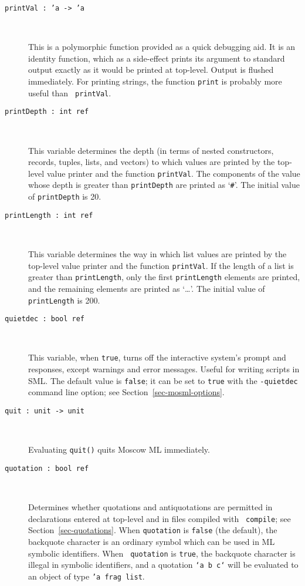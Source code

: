 \documentclass[fleqn]{article}
\begin{document}
\begin{description}
\item[{\tt printVal :\ 'a -> 'a}]\mbox{ }

  This is a polymorphic function provided as a quick debugging aid.
  It is an identity function, which as a side-effect prints its
  argument to standard output exactly as it would be printed at
  top-level.  Output is flushed immediately.  For printing strings,
  the function {\tt print} is probably more useful than {\tt
    printVal}.

\item[{\tt printDepth :\ int ref}]\mbox{ }

  This variable determines the depth (in terms of nested constructors,
  records, tuples, lists, and vectors) to which values are printed by
  the top-level value printer and the function {\tt printVal}. The
  components of the value whose depth is greater than {\tt printDepth}
  are printed as `{\tt \#}'.  The initial value of {\tt printDepth} is
  20. 

\item[{\tt printLength :\ int ref}]\mbox{ }

  This variable determines the way in which list values are printed by
  the top-level value printer and the function {\tt printVal}. If the
  length of a list is greater than {\tt printLength}, only the first
  {\tt printLength} elements are printed, and the remaining elements
  are printed as `\ldots'.  The initial value of {\tt printLength} is
  200.

\item[{\tt quietdec :\ bool ref}]\mbox{ }

  This variable, when {\tt true}, turns off the interactive system's
  prompt and responses, except warnings and error messages.  Useful
  for writing scripts in SML\@.  The default value is {\tt false}; it
  can be set to {\tt true} with the {\tt -quietdec} command line
  option; see Section~\ref{sec-mosml-options}.

\item[{\tt quit :\ unit -> unit}]\mbox{ }

  Evaluating {\tt quit()} quits Moscow ML immediately.

\item[{\tt quotation :\ bool ref}]\mbox{ }

  Determines whether quotations and antiquotations are permitted in
  declarations entered at top-level and in files compiled with {\tt
    compile}; see Section~\ref{sec-quotations}.  When {\tt quotation}
  is {\tt false} (the default), the backquote character is an ordinary
  symbol which can be used in ML symbolic identifiers.  When {\tt
    quotation} is {\tt true}, the backquote character is illegal in
  symbolic identifiers, and a quotation {\tt `a b c`} will be
  evaluated to an object of type {\tt 'a frag list}.


\end{description}
\end{document}
